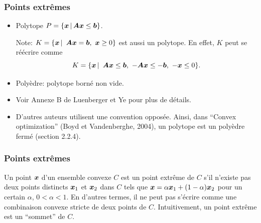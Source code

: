 \documentclass[usepdftitle=false]{beamer}
\begin{document}
\begin{frame}
\frametitle{Points extrêmes}

\mbox{}

\begin{itemize}
\item
{\color{red}Polytope} $P = \lbrace {\boldsymbol{x}} \,|\, {\boldsymbol{A}} {\boldsymbol{x}} \leq {\boldsymbol{b}} \rbrace$.

Note: $K = \lbrace {\boldsymbol{x}} \,|\,\ {\boldsymbol{A}} {\boldsymbol{x}} = {\boldsymbol{b}},\ {\boldsymbol{x}} \geq 0 \rbrace$ est aussi un polytope. En effet, $K$ peut se réécrire comme
$$
K = \lbrace {\boldsymbol{x}} \,|\,\ {\boldsymbol{A}}{\boldsymbol{x}} \leq {\boldsymbol{b}},\ -{\boldsymbol{A}}{\boldsymbol{x}} \leq -{\boldsymbol{b}},\ -{\boldsymbol{x}} \leq 0 \rbrace.
$$
\item
{\color{red}Polyèdre}: polytope borné non vide.
\end{itemize}

\begin{itemize}
	\item 
	Voir Annexe B de Luenberger et Ye pour plus de détails.
	\item
	D'autres auteurs utilisent une convention opposée. Ainsi, dans ``Convex optimization'' (Boyd et Vandenberghe, 2004),
	un polytope est un polyèdre fermé (section 2.2.4).
\end{itemize}




\end{frame}

\begin{frame}
\frametitle{Points extrêmes}

Un point ${\boldsymbol{x}}$ d'un ensemble convexe $C$ est un {\color{red}point extrême} de $C$ s'il n'existe pas deux points distincts ${\boldsymbol{x}}_1$ et ${\boldsymbol{x}}_2$ dans $C$ tels que ${\boldsymbol{x}} = \alpha {\boldsymbol{x}}_1 + (1-\alpha) {\boldsymbol{x}}_2$ pour un certain $\alpha$, $0 < \alpha < 1$.
En d'autres termes, il ne peut pas s'écrire comme une combinaison convexe stricte de deux points de $C$.
Intuitivement, un point extrême est un ``sommet'' de $C$.



\end{frame}
\end{document}
